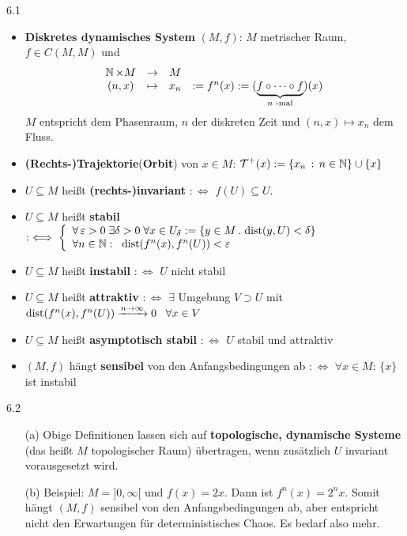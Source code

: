 \documentclass[a4paper]{article}
\begin{document}
\begin{Def}{}{6.1}
\begin{itemize}
\item \textbf{Diskretes dynamisches System} $(M,f)$: $M$ metrischer Raum, $f\in C(M,M)$ und
\[\begin{array}{clcl}
\operatorname{\mathbb N}\times M&\to& M&\\
(n,x)&\mapsto& x_n&:= f^n(x):=(\underbrace{f\circ\cdots\circ f}_{n\text{ -mal}})(x)
\end{array}\]
$M$ entspricht dem Phasenraum, $n$ der \glqq diskreten Zeit\grqq{} und $(n,x)\mapsto x_n$ dem Fluss.
\item \textbf{(Rechts-)Trajektorie}(\textbf{Orbit}) von $x\in M$: $\operatorname{\mathcal{T}}^+(x):=\{x_n\,:\,n\in\operatorname{\mathbb N}\}\cup\{x\}$
\item $U\subseteq M$ heißt \textbf{(rechts-)invariant} $:\iff$ $f(U)\subseteq U$.
\item $U\subseteq M$ heißt \textbf{stabil} $:\iff\left\{\begin{array}{l}
\forall \operatorname{\varepsilon}>0\;\exists \delta>0\;\forall x\in U_{\delta}:=\{y\in M\,.\,\operatorname{\mathrm{dist}}(y, U)<\delta\}\\
\forall n\in\operatorname{\mathbb N}:\;\;\operatorname{\mathrm{dist}}(f^n(x),f^n(U))<\operatorname{\varepsilon}
\end{array}\right.$
\item $U\subseteq M$ heißt \textbf{instabil} $:\iff$ $U$ nicht stabil
\item $U\subseteq M$ heißt \textbf{attraktiv} $:\iff$ $\exists$ Umgebung $V\supset U$ mit $\operatorname{\mathrm{dist}}(f^n(x),f^n(U))\xrightarrow{n\to\infty}0\;\;\;\forall x\in V$
\item $U\subseteq M$ heißt \textbf{asymptotisch stabil} $:\iff$ $U$ stabil und attraktiv
\item $(M,f)$ hängt \textbf{sensibel} von den Anfangsbedingungen ab $:\iff$ $\forall x\in M$: $\{x\}$ ist instabil
 \end{itemize}
\end{Def}

\begin{Bemerkung}{}{6.2}
\begin{itemize}
\item[(a)] Obige Definitionen lassen sich auf \textbf{topologische, dynamische Systeme} (das heißt $M$ topologischer Raum) übertragen, wenn zusätzlich $U$ invariant vorausgesetzt wird.
\item[(b)] Beispiel: $M=]0,\infty[$ und $f(x)=2x$. Dann ist $f^n(x)=2^nx$. Somit hängt $(M,f)$ sensibel von den Anfangsbedingungen ab, aber entspricht nicht den Erwartungen für deterministisches Chaos. Es bedarf also mehr.
\end{itemize}
\end{Bemerkung}
\end{document}
